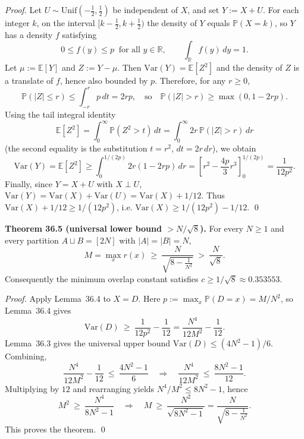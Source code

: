 \noindent\emph{Proof.}
Let \(U\sim\mathrm{Unif}(-\tfrac12,\tfrac12)\) be independent of \(X\), and set \(Y:=X+U\).
For each integer \(k\), on the interval \([k-\tfrac12,k+\tfrac12)\) the density of \(Y\) equals \(\mathbb P(X=k)\), so \(Y\) has a density \(f\) satisfying
\[
0\le f(y)\le p\ \text{ for all }y\in\mathbb R,\qquad \int_{\mathbb R} f(y)\,dy=1.
\]
Let \(\mu:=\mathbb E[Y]\) and \(Z:=Y-\mu\). Then \(\mathrm{Var}(Y)=\mathbb E[Z^2]\) and the density of \(Z\) is a translate of \(f\), hence also bounded by \(p\).
Therefore, for any \(r\ge 0\),
\[
\mathbb P(|Z|\le r)\le \int_{-r}^{r} p\,dt=2rp,
\quad\text{so}\quad
\mathbb P(|Z|>r)\ge \max(0,1-2rp).
\]
Using the tail integral identity
\[
\mathbb E[Z^2]=\int_0^{\infty} \mathbb P(Z^2>t)\,dt
=\int_0^{\infty} 2r\,\mathbb P(|Z|>r)\,dr
\]
(the second equality is the substitution \(t=r^2\), \(dt=2r\,dr\)), we obtain
\[
\mathrm{Var}(Y)=\mathbb E[Z^2]
\ge \int_0^{1/(2p)} 2r(1-2rp)\,dr
=\left[r^2-\frac{4p}{3}r^3\right]_{0}^{1/(2p)}
=\frac{1}{12p^2}.
\]
Finally, since \(Y=X+U\) with \(X\perp U\),
\(
\mathrm{Var}(Y)=\mathrm{Var}(X)+\mathrm{Var}(U)=\mathrm{Var}(X)+1/12
\).
Thus
\(
\mathrm{Var}(X)+1/12\ge 1/(12p^2)
\), i.e.
\(
\mathrm{Var}(X)\ge 1/(12p^2)-1/12
\).
\qed

\medskip
\noindent\textbf{Theorem 36.5 (universal lower bound \(>N/\sqrt8\)).}
For every \(N\ge 1\) and every partition \(A\sqcup B=[2N]\) with \(|A|=|B|=N\),
\[
M=\max_x r(x)\ \ge\ \frac{N}{\sqrt{8-\frac{1}{N^2}}}\ >\ \frac{N}{\sqrt 8}.
\]
Consequently the minimum overlap constant satisfies \(c\ge 1/\sqrt 8\approx 0.353553\).

\noindent\emph{Proof.}
Apply Lemma~36.4 to \(X=D\). Here
\(p:=\max_x\mathbb P(D=x)=M/N^2\), so Lemma~36.4 gives
\[
\mathrm{Var}(D)\ \ge\ \frac{1}{12p^2}-\frac{1}{12}
=\frac{N^4}{12M^2}-\frac{1}{12}.
\]
Lemma~36.3 gives the universal upper bound
\(\mathrm{Var}(D)\le (4N^2-1)/6\).
Combining,
\[
\frac{N^4}{12M^2}-\frac{1}{12}\ \le\ \frac{4N^2-1}{6}
\quad\Rightarrow\quad
\frac{N^4}{12M^2}\ \le\ \frac{8N^2-1}{12}.
\]
Multiplying by \(12\) and rearranging yields
\(
N^4/M^2\le 8N^2-1
\), hence
\[
M^2\ \ge\ \frac{N^4}{8N^2-1}
\quad\Rightarrow\quad
M\ \ge\ \frac{N^2}{\sqrt{8N^2-1}}=\frac{N}{\sqrt{8-\frac{1}{N^2}}}.
\]
This proves the theorem.
\qed

